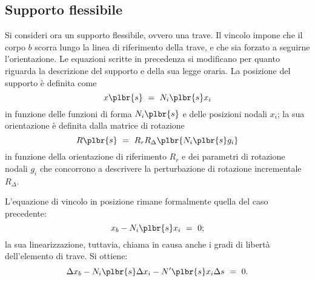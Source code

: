 \documentclass[12pt,dvips,fleqn,italian]{article}
\begin{document}
\subsection*{Supporto flessibile}
Si consideri ora un supporto flessibile, ovvero una trave.
Il vincolo impone che il corpo $b$ scorra lungo la linea di riferimento
della trave, e che sia forzato a seguirne l'orientazione.
Le equazioni scritte in precedenza si modificano per quanto riguarda la
descrizione del supporto e della sua legge oraria.
La posizione del supporto \`{e} definita come
\begin{displaymath}
    x\plbr{s} \ = \ N_i\plbr{s} x_i
\end{displaymath}
in funzione delle funzioni di forma $N_i\plbr{s}$ e delle posizioni nodali
$x_i$; la sua orientazione \`{e} definita dalla matrice di rotazione
\begin{displaymath}
    R\plbr{s} \ = \ R_r R_{\Delta}\plbr{ N_i\plbr{s} g_i }
\end{displaymath}
in funzione della orientazione di riferimento $R_r$ e dei parametri di
rotazione nodali $g_i$ che concorrono a descrivere la perturbazione di
rotazione incrementale $R_{\Delta}$.

\noindent
L'equazione di vincolo in posizione rimane formalmente quella del caso
precedente:
\begin{displaymath}
    x_b - N_i\plbr{s} x_i \ = \ 0 ;
\end{displaymath}
la sua linearizzazione, tuttavia, chiama in causa anche i gradi di
libert\`{a} dell'elemento di trave.
Si ottiene:
\begin{displaymath}
    \Delta{x_b} - N_i\plbr{s} \Delta{x_i} - N'\plbr{s} x_i \Delta{s} \ = \ 0 .
\end{displaymath}
\end{document}
